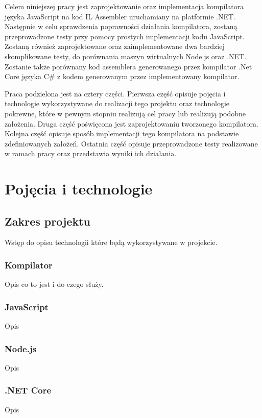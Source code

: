 \documentclass[a4paper]{article}
\begin{document}
\par Celem niniejszej pracy jest zaprojektowanie oraz implementacja kompilatora języka JavaScript na kod IL Assembler uruchamiany na platformie .NET. Następnie w celu sprawdzenia poprawności działania kompilatora, zostaną przeprowadzone testy przy pomocy prostych implementacji kodu JavaScript. Zostaną również zaprojektowane oraz zaimplementowane dwa bardziej skomplikowane testy, do porównania maszyn wirtualnych Node.js oraz .NET. Zostanie także porównany kod assemblera generowanego przez kompilator .Net Core języka C\# z kodem generowanym przez implementowany kompilator.

\par Praca podzielona jest na cztery części. Pierwsza część opisuje pojęcia i technologie wykorzystywane do realizacji tego projektu oraz technologie pokrewne, które w pewnym stopniu realizują cel pracy lub realizują podobne założenia. Druga część poświęcona jest zaprojektowaniu tworzonego kompilatora. Kolejna część opisuje sposób implementacji tego kompilatora na podstawie zdefiniowanych założeń. Ostatnia część opisuje przeprowadzone testy realizowane w ramach pracy oraz przedstawia wyniki ich działania.

\newpage

\section{Pojęcia i technologie}

\subsection{Zakres projektu}
Wstęp do opisu technologii które będą wykorzystywane w projekcie.
\subsubsection{Kompilator}
Opis co to jest i do czego służy.
\subsubsection{JavaScript}
Opis
%

\subsubsection{Node.js}
Opis
\subsubsection{.NET Core}
Opis
\end{document}
